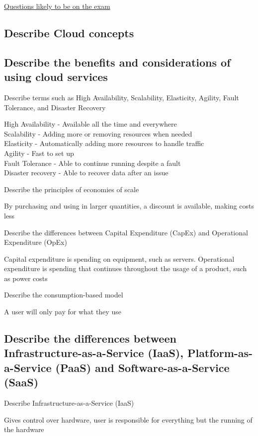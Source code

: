 \documentclass[addpoints]{exam}
\begin{document}
\begin{center}
	\underline{\huge Questions likely to be on the exam}
\end{center}
\begin{questions}
\section{Describe Cloud concepts}
\subsection{Describe the benefits and considerations of using cloud services}
\question Describe terms such as High Availability, Scalability, Elasticity, Agility, Fault Tolerance, and Disaster Recovery
\begin{solution}[2in]
	High Availability - Available all the time and everywhere\\
	Scalability - Adding more or removing resources when needed\\
	Elasticity - Automatically adding more resources to handle traffic\\
	Agility - Fast to set up\\
	Fault Tolerance - Able to continue running despite a fault\\
	Disaster recovery - Able to recover data after an issue
\end{solution}
\question Describe the principles of economies of scale
\begin{solution}[2in]
	By purchasing and using in larger quantities, a discount is available, making costs less
\end{solution}
\question Describe the differences between Capital Expenditure (CapEx) and Operational Expenditure (OpEx)
\begin{solution}[2in]
	Capital expenditure is spending on equipment, such as servers. Operational expenditure is spending that continues throughout the usage of a product, such as power costs
\end{solution}
\question Describe the consumption-based model
\begin{solution}[2in]
	A user will only pay for what they use
\end{solution}
\subsection{Describe the differences between Infrastructure-as-a-Service (IaaS), Platform-as-a-Service (PaaS) and Software-as-a-Service (SaaS)}
\question Describe Infrastructure-as-a-Service (IaaS)
\begin{solution}[2in]
	Gives control over hardware, user is responsible for everything but the running of the hardware
\end{solution}


\end{questions}
\end{document}
